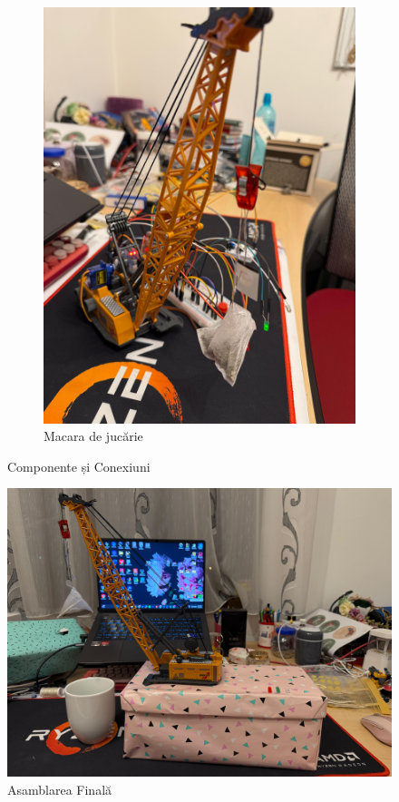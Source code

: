 \begin{figure}[h!]
\begin{subfigure}[b]{0.3\textwidth}
      \includegraphics[width=\textwidth]{figures/5.jpg}
      \caption{Macara de jucărie}
  \end{subfigure}

  \caption{Componente și Conexiuni}
  \label{fig:matrice_imagini}
\end{figure}

\begin{figure}[ht!]
  \centering
  \includegraphics[width=\textwidth]{figures/6.jpg} 
  \caption{Asamblarea Finală}
  \label{fig:fig4}
\end{figure}
